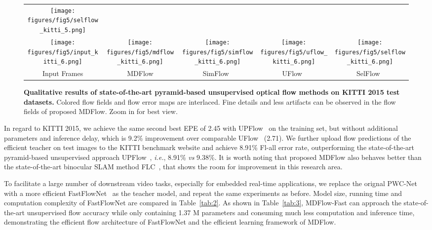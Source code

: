 \documentclass[lettersize,journal]{IEEEtran}
\begin{document}
\begin{figure*}[t]
{\begin{tabular}{@{}c @{\hskip 0.01in} c @{\hskip 0.01in} c @{\hskip 0.01in} c @{\hskip 0.01in} c@{}}
			\texttt{[image: figures/fig5/selflow\_kitti\_5.png]}
			\vspace{-0.7mm}
			\\
			\texttt{[image: figures/fig5/input\_kitti\_6.png]}
			&
			\texttt{[image: figures/fig5/mdflow\_kitti\_6.png]}
			&
			\texttt{[image: figures/fig5/simflow\_kitti\_6.png]}
			&
			\texttt{[image: figures/fig5/uflow\_kitti\_6.png]}
			&
			\texttt{[image: figures/fig5/selflow\_kitti\_6.png]}
			\vspace{-0.1mm}
			\\
			Input Frames & MDFlow & SimFlow~\cite{10.1007/978-3-030-58586-0_11} & UFlow~\cite{10.1007/978-3-030-58536-5_33} & SelFlow~\cite{Liu:2019:SelFlow}
	\end{tabular}}
	\caption{\textbf{Qualitative results of state-of-the-art pyramid-based unsupervised optical flow methods on KITTI 2015 test datasets.} Colored flow fields and flow error maps are interlaced. Fine details and less artifacts can be observed in the flow fields of proposed MDFlow. Zoom in for best view.}
	\label{fig:5}
\end{figure*}

In regard to KITTI 2015, we achieve the same second best EPE of 2.45 with UPFlow~\cite{Luo_2021_CVPR} on the training set, but without additional parameters and inference delay, which is 9.2\% improvement over comparable UFlow~\cite{10.1007/978-3-030-58536-5_33} (2.71). We further upload flow predictions of the efficient teacher on test images to the KITTI benchmark website and achieve 8.91\% Fl-all error rate, outperforming the state-of-the-art pyramid-based unsupervised approach UPFlow~\cite{Luo_2021_CVPR}, \textit{i.e.}, 8.91\% \textit{vs} 9.38\%. It is worth noting that proposed MDFlow also behaves better than the state-of-the-art binocular SLAM method FLC~\cite{Chi_2021_CVPR}, that shows the room for improvement in this research area.

To facilitate a large number of downstream video tasks, especially for embedded real-time applications, we replace the orignal PWC-Net~\cite{8579029} with a more efficient FastFlowNet~\cite{Kong_2021_ICRA} as the teacher model, and repeat the same experiments as before. Model size, running time and computation complexity of FastFlowNet are compared in Table~\ref{tab:2}. As shown in Table~\ref{tab:3}, MDFlow-Fast can approach the state-of-the-art unsupervised flow accuracy while only containing 1.37 M parameters and consuming much less computation and inference time, demonstrating the efficient flow architecture of FastFlowNet and the efficient learning framework of MDFlow.
\end{document}

